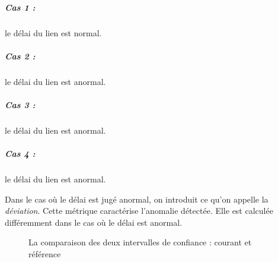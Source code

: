 \subparagraph{Cas 1 :} le délai du lien est normal.
\subparagraph{Cas 2 :} le délai du lien est anormal.
\subparagraph{Cas 3 :} le délai du lien est anormal.
\subparagraph{Cas 4 :} le délai du lien est anormal.

Dans le cas où le délai est jugé anormal, on introduit ce qu'on appelle la \textit{déviation}. Cette métrique caractérise l'anomalie détectée. Elle est calculée différemment dans le cas où le délai est anormal.

\begin{figure}[h]
	\centering
	\captionsetup{justification=centering}
	\resizebox{\textwidth}{!}{
	
}
	\caption{La comparaison des deux intervalles de confiance : courant et référence }
	\label{fig:intervals-comparaison}
\end{figure}

